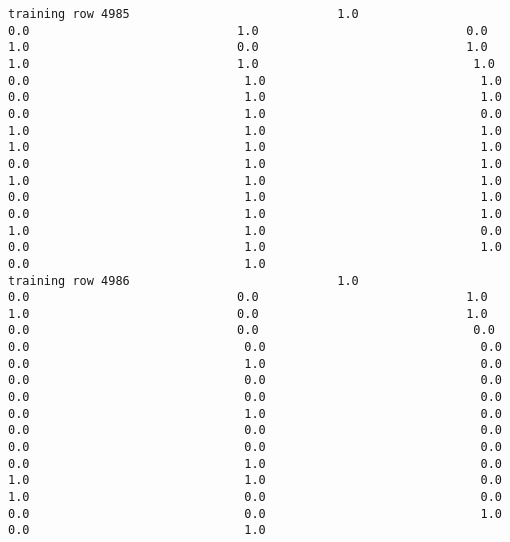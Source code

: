 \documentclass[11pt]{article}
\begin{document}
\begin{verbatim}
training row 4985                             1.0                             0.0                             1.0                             0.0                             1.0                             0.0                             1.0                             1.0                             1.0                              1.0                              0.0                              1.0                              1.0                              0.0                              1.0                              1.0                              0.0                              1.0                              0.0                              1.0                              1.0                              1.0                              1.0                              1.0                              1.0                              0.0                              1.0                              1.0                              1.0                              1.0                              1.0                              0.0                              1.0                              1.0                              0.0                              1.0                              1.0                              1.0                              1.0                              0.0                              0.0                              1.0                              1.0                              0.0                              1.0
training row 4986                             1.0                             0.0                             0.0                             1.0                             1.0                             0.0                             1.0                             0.0                             0.0                              0.0                              0.0                              0.0                              0.0                              0.0                              1.0                              0.0                              0.0                              0.0                              0.0                              0.0                              0.0                              0.0                              0.0                              1.0                              0.0                              0.0                              0.0                              0.0                              0.0                              0.0                              0.0                              0.0                              1.0                              0.0                              1.0                              1.0                              0.0                              1.0                              0.0                              0.0                              0.0                              0.0                              1.0                              0.0                              1.0

\end{verbatim}
\end{document}
